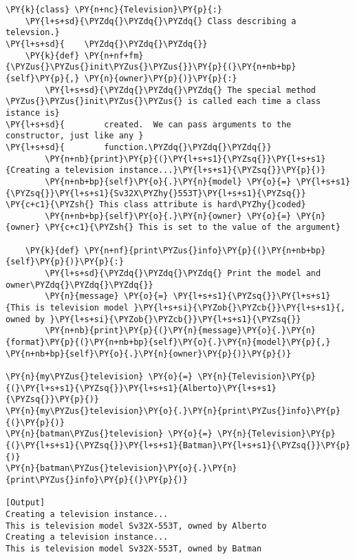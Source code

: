 \begin{Verbatim}[label=\makebox{\url{https://github.com/lucabaldini/cmepda/tree/master/slides/latex/snippets/class\_constructor.py}},commandchars=\\\{\}]
\PY{k}{class} \PY{n+nc}{Television}\PY{p}{:}  
    \PY{l+s+sd}{\PYZdq{}\PYZdq{}\PYZdq{} Class describing a televsion.}
\PY{l+s+sd}{    \PYZdq{}\PYZdq{}\PYZdq{}}
    \PY{k}{def} \PY{n+nf+fm}{\PYZus{}\PYZus{}init\PYZus{}\PYZus{}}\PY{p}{(}\PY{n+nb+bp}{self}\PY{p}{,} \PY{n}{owner}\PY{p}{)}\PY{p}{:}
        \PY{l+s+sd}{\PYZdq{}\PYZdq{}\PYZdq{} The special method \PYZus{}\PYZus{}init\PYZus{}\PYZus{} is called each time a class istance is}
\PY{l+s+sd}{        created.  We can pass arguments to the constructor, just like any }
\PY{l+s+sd}{        function.\PYZdq{}\PYZdq{}\PYZdq{}}
        \PY{n+nb}{print}\PY{p}{(}\PY{l+s+s1}{\PYZsq{}}\PY{l+s+s1}{Creating a television instance...}\PY{l+s+s1}{\PYZsq{}}\PY{p}{)}
        \PY{n+nb+bp}{self}\PY{o}{.}\PY{n}{model} \PY{o}{=} \PY{l+s+s1}{\PYZsq{}}\PY{l+s+s1}{Sv32X\PYZhy{}553T}\PY{l+s+s1}{\PYZsq{}} \PY{c+c1}{\PYZsh{} This class attribute is hard\PYZhy{}coded}
        \PY{n+nb+bp}{self}\PY{o}{.}\PY{n}{owner} \PY{o}{=} \PY{n}{owner} \PY{c+c1}{\PYZsh{} This is set to the value of the argument}
    
    \PY{k}{def} \PY{n+nf}{print\PYZus{}info}\PY{p}{(}\PY{n+nb+bp}{self}\PY{p}{)}\PY{p}{:}
        \PY{l+s+sd}{\PYZdq{}\PYZdq{}\PYZdq{} Print the model and owner\PYZdq{}\PYZdq{}\PYZdq{}}
        \PY{n}{message} \PY{o}{=} \PY{l+s+s1}{\PYZsq{}}\PY{l+s+s1}{This is television model }\PY{l+s+si}{\PYZob{}\PYZcb{}}\PY{l+s+s1}{, owned by }\PY{l+s+si}{\PYZob{}\PYZcb{}}\PY{l+s+s1}{\PYZsq{}}
        \PY{n+nb}{print}\PY{p}{(}\PY{n}{message}\PY{o}{.}\PY{n}{format}\PY{p}{(}\PY{n+nb+bp}{self}\PY{o}{.}\PY{n}{model}\PY{p}{,} \PY{n+nb+bp}{self}\PY{o}{.}\PY{n}{owner}\PY{p}{)}\PY{p}{)}

\PY{n}{my\PYZus{}television} \PY{o}{=} \PY{n}{Television}\PY{p}{(}\PY{l+s+s1}{\PYZsq{}}\PY{l+s+s1}{Alberto}\PY{l+s+s1}{\PYZsq{}}\PY{p}{)}
\PY{n}{my\PYZus{}television}\PY{o}{.}\PY{n}{print\PYZus{}info}\PY{p}{(}\PY{p}{)}
\PY{n}{batman\PYZus{}television} \PY{o}{=} \PY{n}{Television}\PY{p}{(}\PY{l+s+s1}{\PYZsq{}}\PY{l+s+s1}{Batman}\PY{l+s+s1}{\PYZsq{}}\PY{p}{)}
\PY{n}{batman\PYZus{}television}\PY{o}{.}\PY{n}{print\PYZus{}info}\PY{p}{(}\PY{p}{)}

[Output]
Creating a television instance...
This is television model Sv32X-553T, owned by Alberto
Creating a television instance...
This is television model Sv32X-553T, owned by Batman
\end{Verbatim}